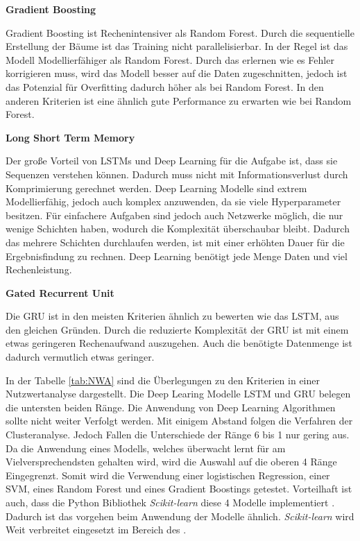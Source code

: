 \textbf{Gradient Boosting}\par
Gradient Boosting ist Rechenintensiver als Random Forest. Durch die sequentielle Erstellung der Bäume ist das Training nicht parallelisierbar. In der Regel ist das Modell Modellierfähiger als Random Forest. Durch das erlernen wie es Fehler korrigieren muss, wird das Modell besser auf die Daten zugeschnitten, jedoch ist das Potenzial für Overfitting dadurch höher als bei Random Forest. In den anderen Kriterien ist eine ähnlich gute Performance zu erwarten wie bei Random Forest.\dubpar

\textbf{Long Short Term Memory}\par
Der große Vorteil von LSTMs und Deep Learning für die Aufgabe ist, dass sie Sequenzen verstehen können. Dadurch muss nicht mit Informationsverlust durch Komprimierung gerechnet werden. Deep Learning Modelle sind extrem Modellierfähig, jedoch auch komplex anzuwenden, da sie viele Hyperparameter besitzen. Für einfachere Aufgaben sind jedoch auch Netzwerke möglich, die nur wenige Schichten haben, wodurch die Komplexität überschaubar bleibt. Dadurch das mehrere Schichten durchlaufen werden, ist mit einer erhöhten Dauer für die Ergebnisfindung zu rechnen. Deep Learning benötigt jede Menge Daten und viel Rechenleistung. \dubpar

\textbf{Gated Recurrent Unit}\par
Die GRU ist in den meisten Kriterien ähnlich zu bewerten wie das LSTM, aus den gleichen Gründen. Durch die reduzierte Komplexität der GRU ist mit einem etwas geringeren Rechenaufwand auszugehen. Auch die benötigte Datenmenge ist dadurch vermutlich etwas geringer.\dubpar

In der Tabelle \ref{tab:NWA} sind die Überlegungen zu den Kriterien in einer Nutzwertanalyse dargestellt. Die Deep Learing Modelle LSTM und GRU belegen die untersten beiden Ränge. Die Anwendung von Deep Learning Algorithmen sollte nicht weiter Verfolgt werden. Mit einigem Abstand folgen die Verfahren der Clusteranalyse. Jedoch Fallen die Unterschiede der Ränge 6 bis 1 nur gering aus. Da die Anwendung eines Modells, welches überwacht lernt für am Vielversprechendsten gehalten wird, wird die Auswahl auf die oberen 4 Ränge Eingegrenzt. Somit wird die Verwendung einer logistischen Regression, einer SVM, eines Random Forest und eines Gradient Boostings getestet. Vorteilhaft ist auch, dass die \gls{Python} \gls{Bibliothek} \textit{Scikit-learn} diese 4 Modelle implementiert \cite{FabianPedregosa.2011, Buitinck.2013}. Dadurch ist das vorgehen beim Anwendung der Modelle ähnlich. \textit{Scikit-learn} wird Weit verbreitet eingesetzt im Bereich des . 

